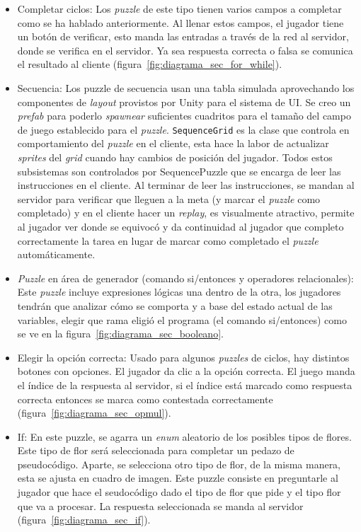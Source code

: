 \begin{itemize}
    \item Completar ciclos: Los \textit{puzzle} de este tipo tienen varios campos a completar como se ha hablado anteriormente. Al llenar estos campos, el jugador tiene un botón de verificar, esto manda las entradas a través de la red al servidor, donde se verifica en el servidor. Ya sea respuesta correcta o falsa se comunica el resultado al cliente (figura~\ref{fig:diagrama_sec_for_while}).
    \item Secuencia: Los puzzle de secuencia usan una tabla simulada aprovechando los componentes de \textit{layout} provistos por Unity para el sistema de UI. Se creo un \textit{prefab} para poderlo \textit{spawnear} suficientes cuadritos para el tamaño del campo de juego establecido para el \textit{puzzle}. \texttt{SequenceGrid} es la clase que controla en comportamiento del \textit{puzzle} en el cliente, esta hace la labor de actualizar \textit{sprites} del \textit{grid} cuando hay cambios de posición del jugador. Todos estos subsistemas son controlados por SequencePuzzle que se encarga de leer las instrucciones en el cliente. Al terminar de leer las instrucciones, se mandan al servidor para verificar que lleguen a la meta (y marcar el \textit{puzzle} como completado) y en el cliente hacer un \textit{replay}, es visualmente atractivo, permite al jugador ver donde se equivocó y da continuidad al jugador que completo correctamente la tarea en lugar de marcar como completado el \textit{puzzle} automáticamente.
    \item  \textit{Puzzle} en área de generador (comando si/entonces y operadores relacionales): Este \textit{puzzle} incluye expresiones lógicas una dentro de la otra, los jugadores tendrán que analizar cómo se comporta y a base del estado actual de las variables, elegir que rama eligió el programa (el comando si/entonces) como se ve en la figura~\ref{fig:diagrama_sec_booleano}.
    \item Elegir la opción correcta: Usado para algunos \textit{puzzles} de ciclos, hay distintos botones con opciones. El jugador da clic a la opción correcta. El juego manda el índice de la respuesta al servidor, si el índice está marcado como respuesta correcta entonces se marca como contestada correctamente (figura~\ref{fig:diagrama_sec_opmul}).
    \item If: En este puzzle, se agarra un \textit{enum} aleatorio de los posibles tipos de flores. Este tipo de flor será seleccionada para completar un pedazo de pseudocódigo. Aparte, se selecciona otro tipo de flor, de la misma manera, esta se ajusta en cuadro de imagen. Este puzzle consiste en preguntarle al jugador que hace el seudocódigo dado el tipo de flor que pide y el tipo flor que va a procesar. La respuesta seleccionada se manda al servidor (figura~\ref{fig:diagrama_sec_if}).

\end{itemize}
